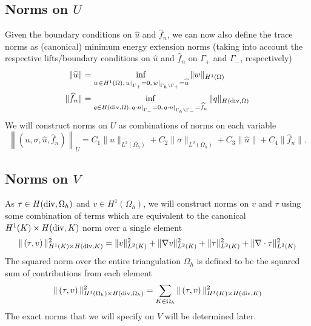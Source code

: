 \documentclass[11pt,onecolumn]{scrartcl}
\newcommand{\grad}{\nabla}
\renewcommand{\div}{\grad \cdot}
\begin{document}
\subsection{Norms on $U$}

Given the boundary conditions on $\widehat{u}$ and $\widehat{f}_n$, we
can now also define the trace norms as (canonical) minimum energy
extension norms (taking into account the respective lifts/boundary
conditions on $\widehat{u}$ and $\widehat{f}_n$ on $\Gamma_+$ and
$\Gamma_-$, respectively)
\begin{align*}
\|\widehat{u}\| &= \inf_{w\in H^1(\Omega),
  \left.w\right|_{\Gamma_+}=0, \left.w\right |_{\Gamma_h\setminus
    \Gamma_+ } = \widehat{u}} \|w\|_{H^1(\Omega)}\\ \|\widehat{f}_n\|
&= \inf_{q\in H({\rm div},\Omega), \left.q\cdot n\right|_{\Gamma_-}=
  0, \left. q\cdot n \right |_{\Gamma_h\setminus
    \Gamma_-} = \widehat{f}_n}
\|q\|_{H({\rm div},\Omega)}
\end{align*}
We will construct norms on $U$ as combinations of norms on each variable
\[
\left\|\left(u,\sigma,\widehat{u},\widehat{f}_n\right)\right\|_U = C_1
\|u\|_{L^2(\Omega_h)} + C_2 \|\sigma\|_{L^2(\Omega_h)} + C_3
\|\widehat{u}\| + C_4 \|\widehat{f}_n\|.
\]
\subsection{Norms on $V$}

As $\tau \in H({\rm div},\Omega_h)$ and $v \in H^1(\Omega_h)$, we will
construct norms on $v$ and $\tau$ using some combination of terms
which are equivalent to the canonical $H^1(K) \times H({\rm div},K)$
norm over a single element
\[
\|\left(\tau,v\right)\|_{H^1(K) \times H({\rm div},K)}^2 =
\|v\|_{L^2(K)}^2 + \|\grad v\|_{L^2(K)}^2 + \|\tau\|_{L^2(K)}^2 +
\|\div \tau\|_{L^2(K)}^2
\]
The squared norm over the entire triangulation $\Omega_h$ is defined to be the squared sum of contributions from each element
\[
\|\left(\tau,v\right)\|_{H^1(\Omega_h) \times H({\rm div},\Omega_h)}^2
= \sum_{K\in \Omega_h} \|\left(\tau,v\right)\|_{H^1(K) \times H({\rm
    div},K)}^2
\]
The exact norms that we will specify on $V$ will be determined later. 
\end{document}
